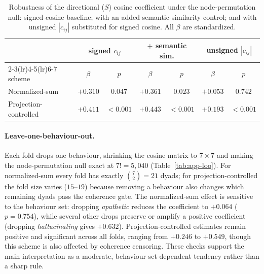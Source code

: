 \begin{table}[h]
  \centering
  \small
  \setlength{\tabcolsep}{5pt}
  \begin{tabular}{lcccccc}
    \toprule
     & \multicolumn{2}{c}{signed $c_{ij}$} & \multicolumn{2}{c}{$+$ semantic sim.} & \multicolumn{2}{c}{unsigned $|c_{ij}|$} \\
    \cmidrule(lr){2-3}\cmidrule(lr){4-5}\cmidrule(lr){6-7}
    scheme & $\beta$ & $p$ & $\beta$ & $p$ & $\beta$ & $p$ \\
    \midrule
    Normalized-sum        & $+0.310$ & $0.047$    & $+0.361$ & $0.023$    & $+0.053$ & $0.742$    \\
    Projection-controlled & $+0.411$ & ${<}0.001$ & $+0.443$ & ${<}0.001$ & $+0.193$ & ${<}0.001$ \\
    \bottomrule
  \end{tabular}
  \caption{Robustness of the directional ($S$) cosine coefficient under the node-permutation
  null: signed-cosine baseline; with an added semantic-similarity control; and with unsigned
  $|c_{ij}|$ substituted for signed cosine. All $\beta$ are standardized.}
  \label{tab:app-dir}
\end{table}

\paragraph{Leave-one-behaviour-out.}
Each fold drops one behaviour, shrinking the cosine matrix to $7\times7$ and making the
node-permutation null exact at $7!=5{,}040$ (Table~\ref{tab:app-loo}). For normalized-sum every
fold has exactly $\binom{7}{2}=21$ dyads; for projection-controlled the fold size varies
($15$--$19$) because removing a behaviour also changes which remaining dyads pass the coherence
gate. The normalized-sum effect is sensitive to the behaviour set: dropping \emph{apathetic}
reduces the coefficient to $+0.064$ ($p=0.754$), while several other drops preserve or amplify a
positive coefficient (dropping \emph{hallucinating} gives $+0.632$). Projection-controlled
estimates remain positive and significant across all folds, ranging from $+0.246$ to $+0.549$,
though this scheme is also affected by coherence censoring. These checks support the main
interpretation as a moderate, behaviour-set-dependent tendency rather than a sharp rule.

